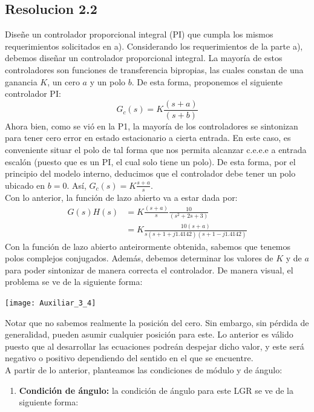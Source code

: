 \documentclass[
  11pt,
  letterpaper,
   addpoints,
   answers
  ]{exam}
\begin{document}
\begin{questions}
\begin{solution}
\subsection*{Resolucion 2.2}
Diseñe un controlador proporcional integral (PI) que cumpla los mismos requerimientos solicitados en a).
Considerando los requerimientos de la parte a), debemos diseñar un controlador proporcional integral. La mayoría de estos controladores son funciones de transferencia bipropias, las cuales constan de una ganancia $K$, un cero $a$ y un polo $b$. De esta forma, proponemos el siguiente controlador PI:
\begin{equation*}
    G_c(s)=K\frac{(s+a)}{(s+b)}
\end{equation*}
Ahora bien, como se vió en la P1, la mayoría de los controladores se sintonizan para tener cero error en estado estacionario a cierta entrada. En este caso, es conveniente situar el polo de tal forma que nos permita alcanzar c.e.e.e a entrada escalón (puesto que es un PI, el cual solo tiene un polo). De esta forma, por el principio del modelo interno, deducimos que el controlador debe tener un polo ubicado en $b=0$. Así, $G_c(s)=K\frac{s+a}{s}$.\\
Con lo anterior, la función de lazo abierto va a estar dada por:
\begin{align}
    G(s)H(s)&=K\frac{(s+a)}{s}\frac{10}{(s^2+2s+3)} \nonumber \\
    &=K\frac{10(s+a)}{s(s+1+j1.4142)(s+1-j1.4142)} \nonumber
\end{align}
Con la función de lazo abierto anteirormente obtenida, sabemos que tenemos polos complejos conjugados. Además, debemos determinar los valores de $K$ y de $a$ para poder sintonizar de manera correcta el controlador. De manera visual, el problema se ve de la siguiente forma:
\begin{center}
    \texttt{[image: Auxiliar\_3\_4]}
  \end{center}
Notar que no sabemos realmente la posición del cero. Sin embargo, sin pérdida de generalidad, pueden asumir cualquier posición para este. Lo anterior es válido puesto que al desarrollar las ecuaciones podreán despejar dicho valor, y este será negativo o positivo dependiendo del sentido en el que se encuentre. \\
A partir de lo anterior, planteamos las condiciones de módulo y de ángulo:
\begin{enumerate}
    \item \textbf{Condición de ángulo: } la condición de ángulo para este LGR se ve de la siguiente forma:

\end{enumerate}
\end{solution}
\end{questions}
\end{document}

